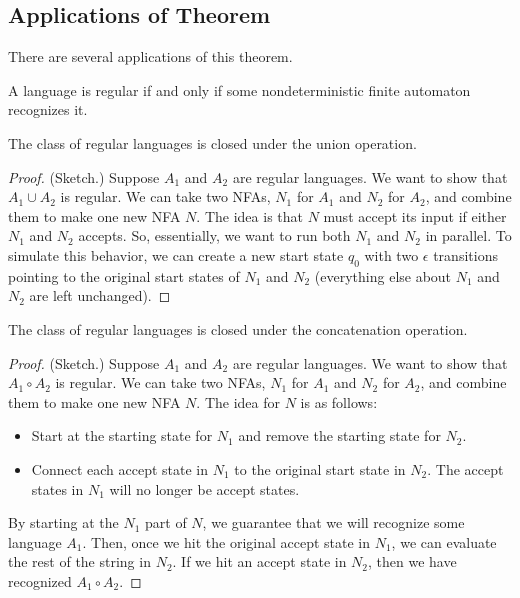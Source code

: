 \documentclass[letterpaper]{article}
\begin{document}
\subsection{Applications of Theorem}
There are several applications of this theorem. 

\begin{corollary}{}{}
    A language is regular if and only if some nondeterministic finite automaton recognizes it.
\end{corollary}


\begin{theorem}{}{}
    The class of regular languages is closed under the union operation.
\end{theorem}

\begin{mdframed}[]
    \begin{proof}
        (Sketch.) Suppose $A_1$ and $A_2$ are regular languages. We want to show that $A_1 \cup A_2$ is regular. We can take two NFAs, $N_1$ for $A_1$ and $N_2$ for $A_2$, and combine them to make one new NFA $N$. The idea is that $N$ must accept its input if either $N_1$ and $N_2$ accepts. So, essentially, we want to run both $N_1$ and $N_2$ in parallel. To simulate this behavior, we can create a new start state $q_0$ with two $\epsilon$ transitions pointing to the original start states of $N_1$ and $N_2$ (everything else about $N_1$ and $N_2$ are left unchanged).    
    \end{proof}
\end{mdframed}


\begin{theorem}{}{}
    The class of regular languages is closed under the concatenation operation.
\end{theorem}

\begin{mdframed}[]
    \begin{proof}
        (Sketch.) Suppose $A_1$ and $A_2$ are regular languages. We want to show that $A_1 \circ A_2$ is regular. We can take two NFAs, $N_1$ for $A_1$ and $N_2$ for $A_2$, and combine them to make one new NFA $N$. The idea for $N$ is as follows: 
        \begin{itemize}
            \item Start at the starting state for $N_1$ and remove the starting state for $N_2$. 
            \item Connect each accept state in $N_1$ to the original start state in $N_2$. The accept states in $N_1$ will no longer be accept states.  
        \end{itemize}
        By starting at the $N_1$ part of $N$, we guarantee that we will recognize some language $A_1$. Then, once we hit the original accept state in $N_1$, we can evaluate the rest of the string in $N_2$. If we hit an accept state in $N_2$, then we have recognized $A_1 \circ A_2$. 
    \end{proof}    
\end{mdframed}
\end{document}
